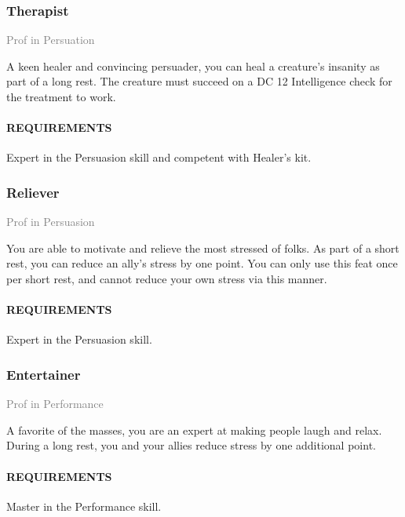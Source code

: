     \subsubsection{Therapist} \label{feat::therapist}
    \small{\textcolor{gray}{Prof in Persuation}}

    \normalsize
    A keen healer and convincing persuader, you can heal a creature's insanity as part of a long rest.
    The creature must succeed on a DC 12 Intelligence check for the treatment to work.
    \paragraph{REQUIREMENTS} Expert in the Persuasion skill and competent with Healer's kit.

\subsubsection{Reliever} \label{feat::reliever}
\small{\textcolor{gray}{Prof in Persuasion}}

\normalsize
You are able to motivate and relieve the most stressed of folks.
As part of a short rest, you can reduce an ally's stress by one point.
You can only use this feat once per short rest, and cannot reduce your own stress via this manner.
\paragraph{REQUIREMENTS} Expert in the Persuasion skill.

\subsubsection{Entertainer} \label{feat::entertainer}
\small{\textcolor{gray}{Prof in Performance}}

\normalsize
A favorite of the masses, you are an expert at making people laugh and relax.
During a long rest, you and your allies reduce stress by one additional point.
\paragraph{REQUIREMENTS} Master in the Performance skill.


